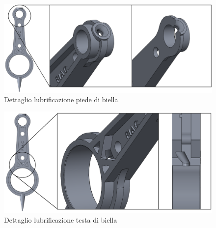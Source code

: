 \begin{figure}[h]
    \centering
    \includegraphics[scale=0.3]{Immagini/LubrificazionePiedeBiella.png}
    \caption{Dettaglio lubrificazione piede di biella}
    \label{fig:LubrificazionePiedeBiella}
\end{figure}
\begin{figure}[h]
    \centering
    \includegraphics[scale=0.3]{Immagini/LubrificazioneTestaBiella.png}
    \caption{Dettaglio lubrificazione testa di biella}
    \label{fig:LubrificazioneTestaBiella}
\end{figure}

